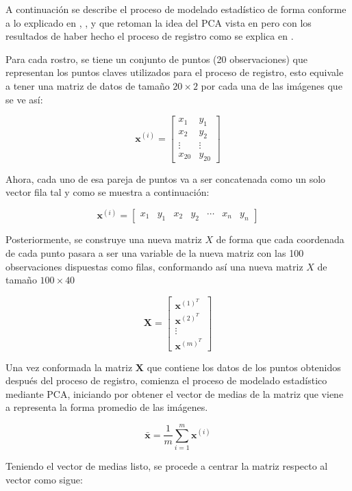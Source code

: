 \documentclass[11pt, letterpaper]{article}
\begin{document}
A continuación se describe el proceso de modelado estadístico de forma conforme a lo explicado en \cite{MPHY0026_SSM}, \cite{SSM_PCA_Basel}, \cite{cootes_pdms} y \cite{sarkalkan_statistical_2014} que retoman la idea del PCA vista en \cite{johnson2007} pero con los resultados de haber hecho el proceso de registro como se explica en \cite{coste2012image}.

Para cada rostro, se tiene un conjunto de puntos (20 observaciones) que representan los puntos claves utilizados para el proceso de registro, esto equivale a tener una matriz de datos de tamaño $20 \times 2$ por cada una de las imágenes que se ve así:


$$
\mathbf{x}^{(i)} = 
\begin{bmatrix} 
	x_1 & y_1 \\
	x_2 & y_2 \\
	\vdots & \vdots \\ 
	x_{20} & y_20 
\end{bmatrix} 
$$

Ahora, cada uno de esa pareja de puntos va a ser concatenada como un solo vector fila tal y como se muestra a continuación:

$$
\mathbf{x}^{(i)} = \begin{bmatrix} x_1 & y_1 & x_2 & y_2 & \cdots & x_n & y_n \end{bmatrix}
$$

Posteriormente, se construye una nueva matriz $X$ de forma que cada coordenada de cada punto pasara a ser una variable de la nueva matriz con las 100 observaciones dispuestas como filas, conformando así una nueva matriz $X$ de tamaño $100\times40$

$$
\mathbf{X} =
\begin{bmatrix}
	\mathbf{x}^{(1)^T} \\
	\mathbf{x}^{(2)^T} \\
	\vdots \\
	\mathbf{x}^{(m)^T}
\end{bmatrix}
$$

Una vez conformada la matriz $\mathbf{X}$ que contiene los datos de los puntos obtenidos después del proceso de registro, comienza el proceso de modelado estadístico mediante PCA, iniciando por obtener el vector de medias de la matriz que viene a representa la forma promedio de las imágenes.

$$
\bar{\mathbf{x}} = \frac{1}{m} \sum_{i=1}^{m} \mathbf{x}^{(i)}
$$

Teniendo el vector de medias listo, se procede a centrar la matriz respecto al vector como sigue:
\end{document}
